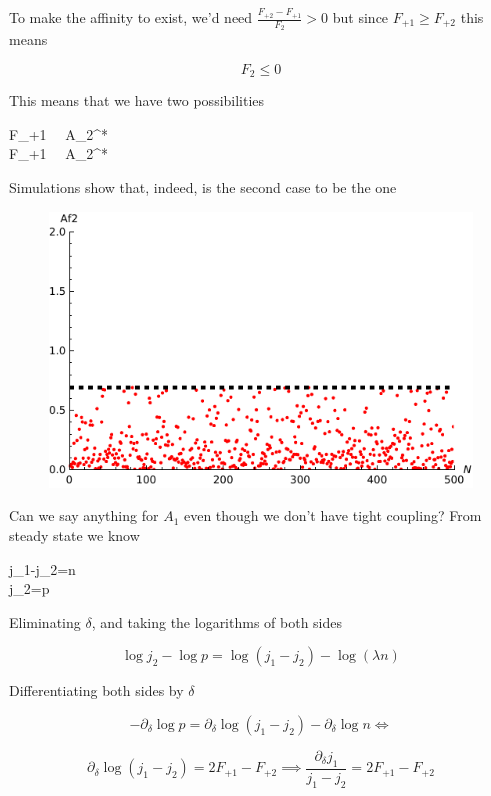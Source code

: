 \documentclass{article}
\begin{document}
	To make the affinity to exist, we'd need $\frac{F_{+2}-F_{+1}}{F_2} >0$ but since $F_{+1} \ge F_{+2}$ this means
	
	$$F_2 \le 0$$
	
	This means that we have two possibilities
	
	\begin{center}
		\begin{cases}
			F_{+1}  \ \Longleftrightarrow \  A_2^* \ge {}\\
			F_{+1}  \ \Longleftrightarrow \ A_2^* \le {}
		\end{cases}
	\end{center}
	
	Simulations show that, indeed, is the second case to be the one
	
	\begin{figure}[H]
		\begin{center}
			\includegraphics[width=0.5\linewidth]{
				A2PP.pdf}
		\end{center}
	\end{figure}
	
	Can we say anything for $A_1$ even though we don't have tight coupling?
	From steady state we know
	
	\begin{center}
		\begin{cases}
			j_1-j_2=\lambda \delta n\\
			j_2=\delta p
		\end{cases}
	\end{center}
	
	Eliminating $\delta$, and taking the logarithms of both sides
	
	$$\log j_2- \log p = \log (j_1-j_2)- \log (\lambda n)$$
	
	Differentiating both sides by $\delta$
	
	$$- \partial_{\delta} \log p = \partial_{\delta} \log (j_1-j_2)- \partial_{\delta} \log n \Longleftrightarrow $$
	
	$$\partial_{\delta} \log (j_1-j_2) = 2 F_{+1} - F_{+2} \implies \frac{\partial_{\delta}j_1}{j_1-j_2}=2 F_{+1} - F_{+2}$$
	
\end{document}
